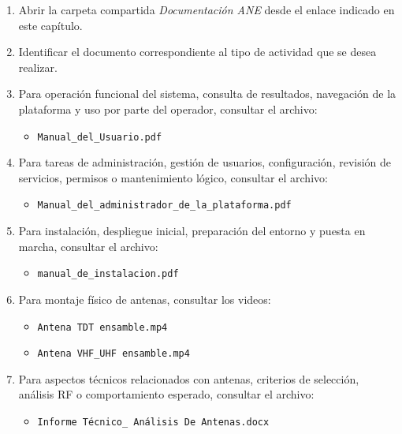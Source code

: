 \begin{enumerate}
    \item Abrir la carpeta compartida \textit{Documentación ANE} desde el enlace indicado en este capítulo.
    
    \item Identificar el documento correspondiente al tipo de actividad que se desea realizar.
    
    \item Para operación funcional del sistema, consulta de resultados, navegación de la plataforma y uso por parte del operador, consultar el archivo:
    \begin{itemize}
        \item \texttt{Manual\_del\_Usuario.pdf}
    \end{itemize}
    
    \item Para tareas de administración, gestión de usuarios, configuración, revisión de servicios, permisos o mantenimiento lógico, consultar el archivo:
    \begin{itemize}
        \item \texttt{Manual\_del\_administrador\_de\_la\_plataforma.pdf}
    \end{itemize}
    
    \item Para instalación, despliegue inicial, preparación del entorno y puesta en marcha, consultar el archivo:
    \begin{itemize}
        \item \texttt{manual\_de\_instalacion.pdf}
    \end{itemize}
    
    \item Para montaje físico de antenas, consultar los videos:
    \begin{itemize}
        \item \texttt{Antena TDT ensamble.mp4}
        \item \texttt{Antena VHF\_UHF ensamble.mp4}
    \end{itemize}
    
    \item Para aspectos técnicos relacionados con antenas, criterios de selección, análisis RF o comportamiento esperado, consultar el archivo:
    \begin{itemize}
        \item \texttt{Informe Técnico\_ Análisis De Antenas.docx}
    \end{itemize}
    

\end{enumerate}

